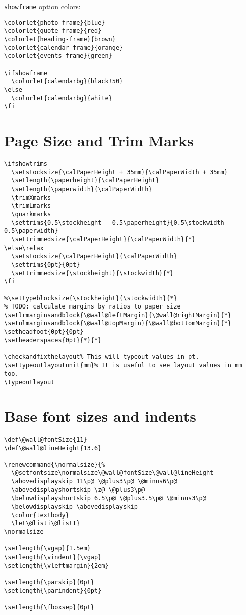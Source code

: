 \documentclass[11pt,oneside]{memoir-article}
\begin{document}
\texttt{showframe} option colors:

\begin{verbatim}
\colorlet{photo-frame}{blue}
\colorlet{quote-frame}{red}
\colorlet{heading-frame}{brown}
\colorlet{calendar-frame}{orange}
\colorlet{events-frame}{green}

\ifshowframe
  \colorlet{calendarbg}{black!50}
\else
  \colorlet{calendarbg}{white}
\fi
\end{verbatim}

\section{Page Size and Trim Marks}
\label{sec-6-5}

\begin{verbatim}
\ifshowtrims
  \setstocksize{\calPaperHeight + 35mm}{\calPaperWidth + 35mm}
  \setlength{\paperheight}{\calPaperHeight}
  \setlength{\paperwidth}{\calPaperWidth}
  \trimXmarks
  \trimLmarks
  \quarkmarks
  \settrims{0.5\stockheight - 0.5\paperheight}{0.5\stockwidth - 0.5\paperwidth}
  \settrimmedsize{\calPaperHeight}{\calPaperWidth}{*}
\else\relax
  \setstocksize{\calPaperHeight}{\calPaperWidth}
  \settrims{0pt}{0pt}
  \settrimmedsize{\stockheight}{\stockwidth}{*}
\fi

%\settypeblocksize{\stockheight}{\stockwidth}{*}
% TODO: calculate margins by ratios to paper size
\setlrmarginsandblock{\@wall@leftMargin}{\@wall@rightMargin}{*}
\setulmarginsandblock{\@wall@topMargin}{\@wall@bottomMargin}{*}
\setheadfoot{0pt}{0pt}
\setheaderspaces{0pt}{*}{*}

\checkandfixthelayout% This will typeout values in pt.
\settypeoutlayoutunit{mm}% It is useful to see layout values in mm too.
\typeoutlayout
\end{verbatim}

\section{Base font sizes and indents}
\label{sec-6-6}

\begin{verbatim}
\def\@wall@fontSize{11}
\def\@wall@lineHeight{13.6}

\renewcommand{\normalsize}{%
  \@setfontsize\normalsize\@wall@fontSize\@wall@lineHeight
  \abovedisplayskip 11\p@ \@plus3\p@ \@minus6\p@
  \abovedisplayshortskip \z@ \@plus3\p@
  \belowdisplayshortskip 6.5\p@ \@plus3.5\p@ \@minus3\p@
  \belowdisplayskip \abovedisplayskip
  \color{textbody}
  \let\@listi\@listI}
\normalsize

\setlength{\vgap}{1.5em}
\setlength{\vindent}{\vgap}
\setlength{\vleftmargin}{2em}

\setlength{\parskip}{0pt}
\setlength{\parindent}{0pt}

\setlength{\fboxsep}{0pt}
\end{verbatim}
\end{document}
